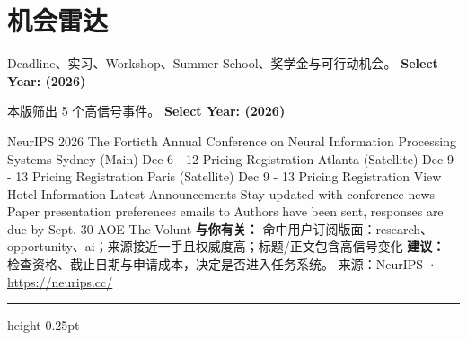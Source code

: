 \documentclass[10.5pt]{ctexart}
\begin{document}
\section*{机会雷达}
{\color{ormuted} Deadline、实习、Workshop、Summer School、奖学金与可行动机会。}
\vspace{2mm}
{\LARGE\bfseries Select Year: (2026)}\par
\vspace{1mm}
{\color{ormuted} 本版筛出 5 个高信号事件。}
\vspace{3mm}
{\Large\bfseries Select Year: (2026)}\par
NeurIPS 2026 The Fortieth Annual Conference on Neural Information Processing Systems Sydney (Main) Dec 6 - 12 Pricing Registration Atlanta (Satellite) Dec 9 - 13 Pricing Registration Paris (Satellite) Dec 9 - 13 Pricing Registration View Hotel Information Latest Announcements Stay updated with conference news Paper presentation preferences emails to Authors have been sent, responses are due by Sept. 30 AOE The Volunt
\textbf{与你有关：} 命中用户订阅版面：research、opportunity、ai；来源接近一手且权威度高；标题/正文包含高信号变化
\textbf{建议：} 检查资格、截止日期与申请成本，决定是否进入任务系统。
{\footnotesize\color{ormuted} 来源：NeurIPS · \url{https://neurips.cc/}}
\vspace{4mm}
\hrule height 0.25pt
\vspace{3mm}
\end{document}
